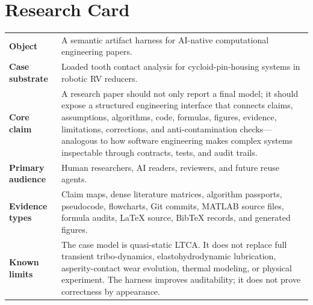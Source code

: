 \documentclass{article}
\begin{document}
\begin{abstract}
\textbf{Demonstration.}
The format is demonstrated through a loaded tooth contact analysis (LTCA) program for cycloid-pin-housing systems in robotic RV reducers. The manuscript itself is used as a self-bootstrapping AI-assisted artifact: its code inspection, manuscript structure, tables, figures, literature matrices, BibTeX records, and correction traces were iteratively generated, reorganized, and audited through human--AI interaction. The case demonstrates that SE practices---contract-driven design, interface specification, regression testing, and supply-chain integrity---transfer naturally to computational research artifacts, even though the primary output remains a reshaped research paper.
\end{abstract}


\section*{Research Card}

\begin{center}
\begin{tabular}{p{3.0cm}p{10.5cm}}
\toprule
\textbf{Object} & A semantic artifact harness for AI-native computational engineering papers. \\
\textbf{Case substrate} & Loaded tooth contact analysis for cycloid-pin-housing systems in robotic RV reducers. \\
\textbf{Core claim} & A research paper should not only report a final model; it should expose a structured engineering interface that connects claims, assumptions, algorithms, code, formulas, figures, evidence, limitations, corrections, and anti-contamination checks---analogous to how software engineering makes complex systems inspectable through contracts, tests, and audit trails. \\
\textbf{Primary audience} & Human researchers, AI readers, reviewers, and future reuse agents. \\
\textbf{Evidence types} & Claim maps, dense literature matrices, algorithm passports, pseudocode, flowcharts, Git commits, MATLAB source files, formula audits, LaTeX source, BibTeX records, and generated figures. \\
\textbf{Known limits} & The case model is quasi-static LTCA. It does not replace full transient tribo-dynamics, elastohydrodynamic lubrication, asperity-contact wear evolution, thermal modeling, or physical experiment. The harness improves auditability; it does not prove correctness by appearance. \\
\bottomrule
\end{tabular}
\end{center}
\end{document}
